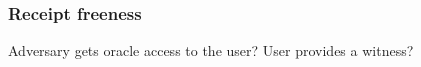 \subsubsection{Receipt freeness}

\begin{frame}
\begin{definition}
  Adversary gets oracle access to the user?
  User provides a witness?
\end{definition}
\end{frame}

